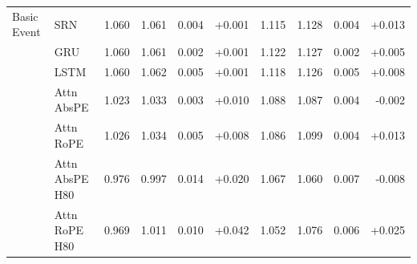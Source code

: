 \begin{longtable}{@{}llrrrrrrrr@{}}
\addlinespace
Basic Event & SRN & 1.060 & 1.061 & 0.004 & +0.001 & 1.115 & 1.128 & 0.004 & +0.013 \\
 & GRU & 1.060 & 1.061 & 0.002 & +0.001 & 1.122 & 1.127 & 0.002 & +0.005 \\
 & LSTM & 1.060 & 1.062 & 0.005 & +0.001 & 1.118 & 1.126 & 0.005 & +0.008 \\
 & Attn AbsPE & 1.023 & 1.033 & 0.003 & +0.010 & 1.088 & 1.087 & 0.004 & -0.002 \\
 & Attn RoPE & 1.026 & 1.034 & 0.005 & +0.008 & 1.086 & 1.099 & 0.004 & +0.013 \\
 & Attn AbsPE H80 & 0.976 & 0.997 & 0.014 & +0.020 & 1.067 & 1.060 & 0.007 & -0.008 \\
 & Attn RoPE H80 & 0.969 & 1.011 & 0.010 & +0.042 & 1.052 & 1.076 & 0.006 & +0.025 \\
\end{longtable}
\normalsize
